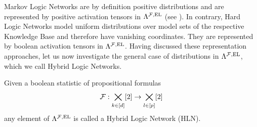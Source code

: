 %
%




\label{sec:hybridNetworks}

Markov Logic Networks are by definition positive distributions and are represented by positive activation tensors in $\Lambda^{\mathcal{F},\mathrm{EL}}$ (see ).
In contrary, Hard Logic Networks model uniform distributions over model sets of the respective Knowledge Base and therefore have vanishing coordinates.
They are represented by boolean activation tensors in $\Lambda^{\mathcal{F},\mathrm{EL}}$.
Having discussed these representation approaches, let us now investigate the general case of distributions in $\Lambda^{\mathcal{F},\mathrm{EL}}$, which we call Hybrid Logic Networks.

\begin{definition}
    \label{def:hln}
    Given a boolean statistic of propositional formulas
    \begin{align*}
        \mathcal{F} : \bigtimes_{k\in[d]}[2] \rightarrow \bigtimes_{l\in[p]}[2]
    \end{align*}
    any element of $\Lambda^{\mathcal{F},\mathrm{EL}}$ is called a Hybrid Logic Network (HLN).
\end{definition}

